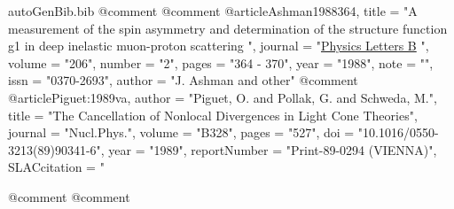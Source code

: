 \begin{filecontents*}{autoGenBib.bib}
@comment %
@comment %
@article{Ashman1988364,
title = "A measurement of the spin asymmetry and determination of the structure function g1 in deep inelastic muon-proton scattering ",
journal = "\href{http://www.sciencedirect.com/science/article/pii/0370269388915237}{Physics Letters B} ",
volume = "206",
number = "2",
pages = "364 - 370",
year = "1988",
note = "",
issn = "0370-2693",
author = "J. Ashman and other"
}
@comment %
@article{Piguet:1989va,
      author         = "Piguet, O. and Pollak, G. and Schweda, M.",
      title          = "{The Cancellation of Nonlocal Divergences in Light Cone Theories}",
      journal        = "Nucl.Phys.",
      volume         = "B328",
      pages          = "527",
      doi            = "10.1016/0550-3213(89)90341-6",
      year           = "1989",
      reportNumber   = "Print-89-0294 (VIENNA)",
      SLACcitation   = "%
}
	
@comment %
@comment %


\end{filecontents*}

